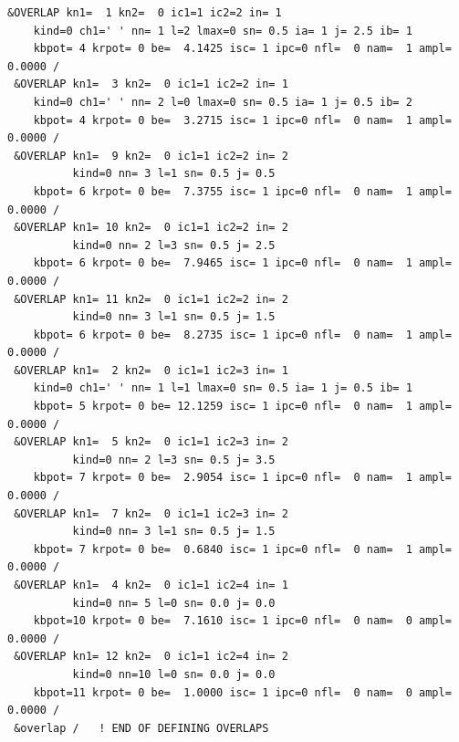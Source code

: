 \documentclass[11pt]{book}
\begin{document}
\begin{small}
\begin{lstlisting}[frame=single]
 &OVERLAP kn1=  1 kn2=  0 ic1=1 ic2=2 in= 1                                     
    kind=0 ch1=' ' nn= 1 l=2 lmax=0 sn= 0.5 ia= 1 j= 2.5 ib= 1                  
    kbpot= 4 krpot= 0 be=  4.1425 isc= 1 ipc=0 nfl=  0 nam=  1 ampl=  0.0000 /  
 &OVERLAP kn1=  3 kn2=  0 ic1=1 ic2=2 in= 1                                     
    kind=0 ch1=' ' nn= 2 l=0 lmax=0 sn= 0.5 ia= 1 j= 0.5 ib= 2                  
    kbpot= 4 krpot= 0 be=  3.2715 isc= 1 ipc=0 nfl=  0 nam=  1 ampl=  0.0000 /  
 &OVERLAP kn1=  9 kn2=  0 ic1=1 ic2=2 in= 2                                     
          kind=0 nn= 3 l=1 sn= 0.5 j= 0.5                                       
    kbpot= 6 krpot= 0 be=  7.3755 isc= 1 ipc=0 nfl=  0 nam=  1 ampl=  0.0000 /  
 &OVERLAP kn1= 10 kn2=  0 ic1=1 ic2=2 in= 2                                     
          kind=0 nn= 2 l=3 sn= 0.5 j= 2.5                                       
    kbpot= 6 krpot= 0 be=  7.9465 isc= 1 ipc=0 nfl=  0 nam=  1 ampl=  0.0000 /  
 &OVERLAP kn1= 11 kn2=  0 ic1=1 ic2=2 in= 2                                     
          kind=0 nn= 3 l=1 sn= 0.5 j= 1.5                                       
    kbpot= 6 krpot= 0 be=  8.2735 isc= 1 ipc=0 nfl=  0 nam=  1 ampl=  0.0000 /  
 &OVERLAP kn1=  2 kn2=  0 ic1=1 ic2=3 in= 1                                     
    kind=0 ch1=' ' nn= 1 l=1 lmax=0 sn= 0.5 ia= 1 j= 0.5 ib= 1                  
    kbpot= 5 krpot= 0 be= 12.1259 isc= 1 ipc=0 nfl=  0 nam=  1 ampl=  0.0000 /  
 &OVERLAP kn1=  5 kn2=  0 ic1=1 ic2=3 in= 2                                     
          kind=0 nn= 2 l=3 sn= 0.5 j= 3.5                                       
    kbpot= 7 krpot= 0 be=  2.9054 isc= 1 ipc=0 nfl=  0 nam=  1 ampl=  0.0000 /  
 &OVERLAP kn1=  7 kn2=  0 ic1=1 ic2=3 in= 2                                     
          kind=0 nn= 3 l=1 sn= 0.5 j= 1.5                                       
    kbpot= 7 krpot= 0 be=  0.6840 isc= 1 ipc=0 nfl=  0 nam=  1 ampl=  0.0000 /  
 &OVERLAP kn1=  4 kn2=  0 ic1=1 ic2=4 in= 1                                     
          kind=0 nn= 5 l=0 sn= 0.0 j= 0.0                                       
    kbpot=10 krpot= 0 be=  7.1610 isc= 1 ipc=0 nfl=  0 nam=  0 ampl=  0.0000 /  
 &OVERLAP kn1= 12 kn2=  0 ic1=1 ic2=4 in= 2                                     
          kind=0 nn=10 l=0 sn= 0.0 j= 0.0                                       
    kbpot=11 krpot= 0 be=  1.0000 isc= 1 ipc=0 nfl=  0 nam=  0 ampl=  0.0000 /  
 &overlap /   ! END OF DEFINING OVERLAPS                                        
                                                                                

\end{lstlisting}
\end{small}
\end{document}
